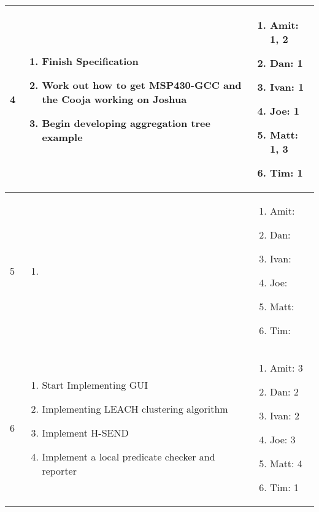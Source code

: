 \begin{table}[H]
\begin{tabular}{| l | p{7.5cm} | p{5cm} |}
	
	4 & \begin{enumerate}
			\item Finish Specification
			\item Work out how to get MSP430-GCC and the Cooja working on Joshua
			\item Begin developing aggregation tree example
		\end{enumerate} &
	\begin{enumerate}
		\item[] Amit: 1, 2
		\item[] Dan: 1
		\item[] Ivan: 1
		\item[] Joe: 1
		\item[] Matt: 1, 3
		\item[] Tim: 1
	\end{enumerate}
	\\ \hline
	
	
	5 & \begin{enumerate}
			\item 
		\end{enumerate} &
	\begin{enumerate}
		\item[] Amit: ~
		\item[] Dan: ~
		\item[] Ivan: ~
		\item[] Joe: ~
		\item[] Matt: ~
		\item[] Tim: ~
	\end{enumerate}
	\\ \hline
	
	
	6 & \begin{enumerate}
			\item Start Implementing GUI
			\item Implementing LEACH clustering algorithm
			\item Implement H-SEND
			\item Implement a local predicate checker and reporter
		\end{enumerate} &
	\begin{enumerate}
		\item[] Amit: 3
		\item[] Dan: 2
		\item[] Ivan: 2
		\item[] Joe: 3
		\item[] Matt: 4
		\item[] Tim: 1
	\end{enumerate}
	\\ \hline

	\end{tabular}
\end{table}


